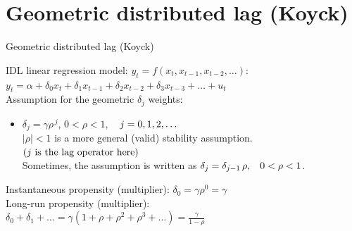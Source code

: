 \documentclass{beamer}
\begin{document}
\section{Geometric distributed lag (Koyck) }
\begin{frame}{Geometric distributed lag (Koyck) }

IDL linear regression model: $y_t = f(x_t, x_{t-1}, x_{t-2}, \dots)$: 
\\ \vspace{0.3cm}
$ y_t = \alpha + \delta_0 x_t + \delta_1 x_{t-1} + \delta_2 x_{t-2} + \delta_3 x_{t-3} 
+ \dots + u_t$ \\ \vspace{0.3cm}
Assumption for the geometric $\delta_j$ weights:
\begin{itemize}
\item $ \delta_{j} = \gamma \rho^{\,j}$, \hspace{0.3cm} $0 < \rho < 1 $, $\hspace{0.3cm} j=0,1,2,\dots $\\
\smallskip
$|\rho|<1$ is a more general (valid) stability assumption.\\
$\left( j \textnormal{~is the lag operator here} \right)$\\
Sometimes, the assumption is written as $\delta_j = \delta_{j-1}\, \rho, \hspace{0.3cm} 0 < \rho < 1 $.
\end{itemize}
 
\vspace{0.3cm}
Instantaneous propensity (multiplier): $ \delta_0 = \gamma \rho^0 = \gamma$ 
\\ \vspace{0.3cm}
Long-run propensity (multiplier):
\\ \vspace{0.3cm}
$\delta_0+\delta_1+\dots=\gamma(1+\rho+\rho^2+\rho^3+\dots)=\frac{\gamma}{1-\rho}$

\end{frame}
\end{document}
